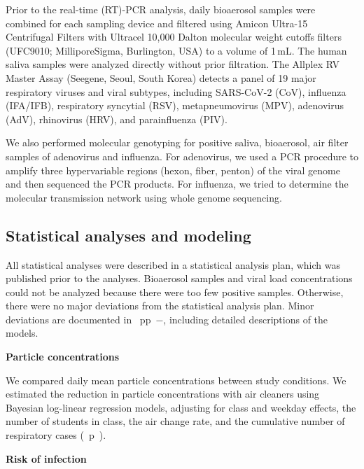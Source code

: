 \documentclass[fleqn,11pt]{wlscirep}
\begin{document}
Prior to the real-time (RT)-PCR analysis, daily bioaerosol samples were combined for each sampling device and filtered using Amicon Ultra-15 Centrifugal Filters with Ultracel 10,000 Dalton molecular weight cutoffs filters (UFC9010; MilliporeSigma, Burlington, USA) to a volume of 1\,mL. The human saliva samples were analyzed directly without prior filtration. The Allplex RV Master Assay (Seegene, Seoul, South Korea) detects a panel of 19 major respiratory viruses and viral subtypes, including SARS-CoV-2 (CoV), influenza (IFA/IFB), respiratory syncytial (RSV), metapneumovirus (MPV), adenovirus (AdV), rhinovirus (HRV), and parainfluenza (PIV). 

We also performed molecular genotyping for positive saliva, bioaerosol, air filter samples of adenovirus and influenza. For adenovirus, we used a PCR procedure to amplify three hypervariable regions (hexon, fiber, penton) of the viral genome and then sequenced the PCR products.\cite{Akello2021SciRep} For influenza, we tried to determine the molecular transmission network using whole genome sequencing.\cite{Kelly2022FrontiersImmuno}

\subsection*{Statistical analyses and modeling}

All statistical analyses were described in a statistical analysis plan,\cite{Banholzer2023SAP} which was published prior to the analyses. Bioaerosol samples and viral load concentrations could not be analyzed because there were too few positive samples. Otherwise, there were no major deviations from the statistical analysis plan. Minor deviations are documented in \supp~pp~$-$, including detailed descriptions of the models. \medskip

\noindent\textbf{Particle concentrations} \smallskip

\noindent We compared daily mean particle concentrations between study conditions. We estimated the reduction in particle concentrations with air cleaners using Bayesian log-linear regression models, adjusting for class and weekday effects, the number of students in class, the air change rate, and the cumulative number of respiratory cases (\supp~p~). \medskip

\noindent\textbf{Risk of infection} \smallskip
\end{document}
